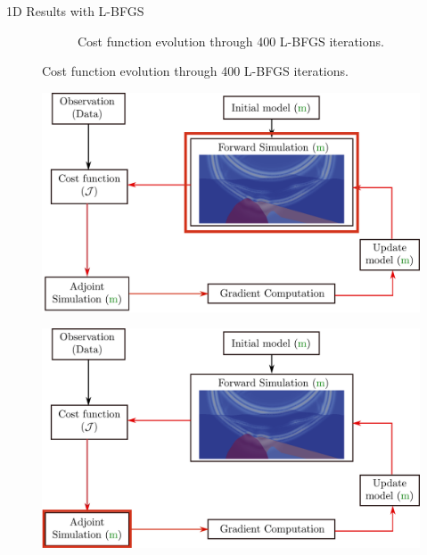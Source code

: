 \begin{frame}{1D Results with L-BFGS}
\begin{figure}[!htbp]
\begin{subfigure}{0.45\textwidth}
          \caption*{\small{Cost function evolution through 400 L-BFGS iterations.}}
          \label{cf_DTO_vs_OTD}
         \end{subfigure}
         \end{figure}

\end{frame}


\begin{frame}
\begin{figure}
  \includegraphics[scale=0.31]{image/fwi_workflow_red.pdf}
\end{figure}
\end{frame}

\begin{frame}[noframenumbering]
\begin{figure}
  \includegraphics[scale=0.31]{image/fwi_workflow_red2.pdf}
\end{figure}
\end{frame}

